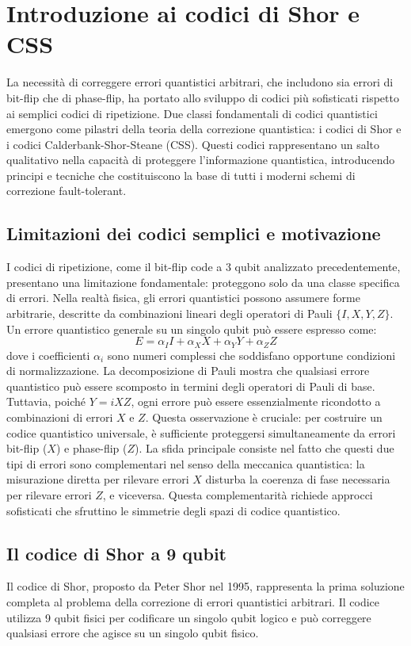 \documentclass[a4paper,12pt]{report}
\theoremstyle{plain}
\begin{document}
\section{Introduzione ai codici di Shor e CSS}
La necessità di correggere errori quantistici arbitrari, che includono sia errori di bit-flip che di phase-flip, ha portato allo sviluppo di codici più sofisticati rispetto ai semplici codici di ripetizione. Due classi fondamentali di codici quantistici emergono come pilastri della teoria della correzione quantistica: i codici di Shor e i codici Calderbank-Shor-Steane (CSS). Questi codici rappresentano un salto qualitativo nella capacità di proteggere l'informazione quantistica, introducendo principi e tecniche che costituiscono la base di tutti i moderni schemi di correzione fault-tolerant.
\subsection{Limitazioni dei codici semplici e motivazione}
I codici di ripetizione, come il bit-flip code a 3 qubit analizzato precedentemente, presentano una limitazione fondamentale: proteggono solo da una classe specifica di errori. Nella realtà fisica, gli errori quantistici possono assumere forme arbitrarie, descritte da combinazioni lineari degli operatori di Pauli $\{I, X, Y, Z\}$. Un errore quantistico generale su un singolo qubit può essere espresso come:
\[
E = \alpha_I I + \alpha_X X + \alpha_Y Y + \alpha_Z Z
\]
dove i coefficienti $\alpha_i$ sono numeri complessi che soddisfano opportune condizioni di normalizzazione.
La decomposizione di Pauli mostra che qualsiasi errore quantistico può essere scomposto in termini degli operatori di Pauli di base. Tuttavia, poiché $Y = iXZ$, ogni errore può essere essenzialmente ricondotto a combinazioni di errori $X$ e $Z$. Questa osservazione è cruciale: per costruire un codice quantistico universale, è sufficiente proteggersi simultaneamente da errori bit-flip ($X$) e phase-flip ($Z$).
La sfida principale consiste nel fatto che questi due tipi di errori sono complementari nel senso della meccanica quantistica: la misurazione diretta per rilevare errori $X$ disturba la coerenza di fase necessaria per rilevare errori $Z$, e viceversa. Questa complementarità richiede approcci sofisticati che sfruttino le simmetrie degli spazi di codice quantistico.
\subsection{Il codice di Shor a 9 qubit}
Il codice di Shor, proposto da Peter Shor nel 1995, rappresenta la prima soluzione completa al problema della correzione di errori quantistici arbitrari. Il codice utilizza 9 qubit fisici per codificare un singolo qubit logico e può correggere qualsiasi errore che agisce su un singolo qubit fisico.
\end{document}
